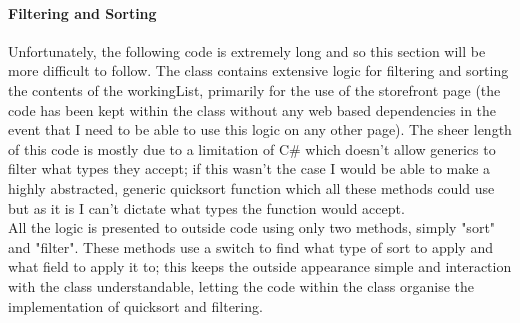 ﻿\documentclass{article}
\begin{document}
    \paragraph{Filtering and Sorting}
    Unfortunately, the following code is extremely long and so this section will be more difficult to follow.
    The class contains extensive logic for filtering and sorting the contents of the workingList, primarily for the use of the storefront page (the code has been kept within the class without any web based dependencies in the event that I need to be able to use this logic on any other page).
    The sheer length of this code is mostly due to a limitation of C\# which doesn't allow generics to filter what types they accept; if this wasn't the case I would be able to make a highly abstracted, generic quicksort function which all these methods could use but as it is I can't dictate what types the function would accept.
    \\
    All the logic is presented to outside code using only two methods, simply "sort" and "filter".
    These methods use a switch to find what type of sort to apply and what field to apply it to; this keeps the outside appearance simple and interaction with the class understandable, letting the code within the class organise the implementation of quicksort and filtering.
\end{document}

